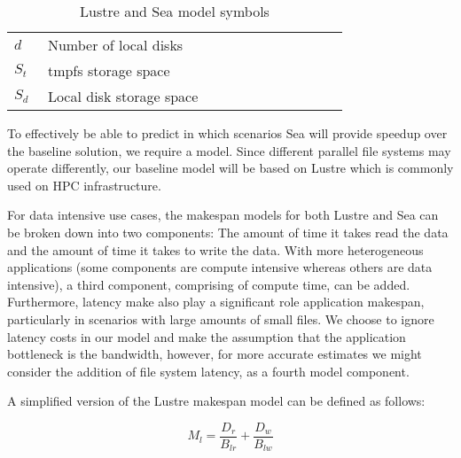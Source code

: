 \begin{table}
\begin{tabular}{|p{0.05\linewidth}|p{0.6\linewidth}|p{0.1\linewidth}|}
       $d$ & Number of local disks & \\              
       $S_{t}$ & tmpfs storage space & \\
       $S_{d}$ & Local disk storage space & \\
       \hline                                                                      
      \end{tabular}                                                                
      \caption{Lustre and Sea model symbols}                                       
      \label{table:1}                                                              
      \end{table}  



      To effectively be able to predict in which scenarios Sea will provide speedup
      over the baseline solution, we require a model. Since different parallel file
      systems may operate differently, our baseline model will be based on Lustre which
      is commonly used on HPC infrastructure.

      For data intensive use cases, the makespan models for both Lustre and Sea can be broken
      down into two components: The amount of time it takes read the data and the amount
      of time it takes to write the data. With more heterogeneous applications (some components
      are compute intensive whereas others are data intensive), a third component, comprising
      of compute time, can be added. Furthermore, latency make also play a significant role
      application makespan, particularly in scenarios with large amounts of small files.
      We choose to ignore latency costs in our model and make the assumption that the
      application bottleneck is the bandwidth, however, for more accurate estimates we
      might consider the addition of file system latency, as a fourth model component.

      A simplified version of the Lustre makespan model can be defined as follows:

      \begin{equation}\label{eq:lustrenpc}
          M_{l} =  \frac{D_{r}}{B_{lr}} + \frac{D_{w}}{B_{lw}}
      \end{equation}


